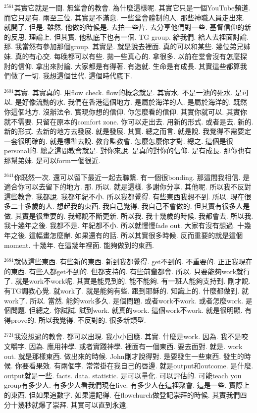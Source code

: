 \documentclass{book}
\begin{document}
$^{2561}$其實它就是一間.
無堂會的教會.
為什麼這樣呢.
其實它只是一個YouTube頻道.
而它只是有.
兩至三位.
其實是不滿意.
一些堂會體制的人.
那些神職人員走出來.
就開了.
但是.
雖然.
他做的時候是.
去拍一些片.
去分享他們對一些.
基督信仰的新的反思.
理論上.
但其實.
他私底下也有一個.
TG group.
給我們.
給人去裡面討論.
那.
我當然有參加那個group.
其實是.
就是說去裡面.
真的可以和某些.
幾位弟兄姊妹.
真的有心交.
每晚都可以有些.
拋一些真心的.
拿很多.
以前在堂會沒有怎麼探討的信仰.
拿出來討論.
大家都是有得著.
有造就.
生命是有成長.
其實這些都算我們做了一切.
我想這個世代.
這個時代底下.

$^{2601}$其實.
其實真的.
用flow check.
flow的概念就是.
其實水.
不是一池的死水.
是可以.
是好像流動的水.
我們在香港這個地方.
是屬於海洋的人.
是屬於海洋的.
既然你這個地方.
沒辦法令.
實現你想的信仰.
你怎麼看的信仰.
其實你就可以.
其實你就不需要.
只留在原本的comfort zone.
你可以走出去.
用新的形式.
或者是去.
新的.
新的形式.
去新的地方去發展.
就是發展.
其實.
總之而言.
就是說.
我覺得不需要定一套很明確的.
就是標準去說.
教育監教會.
怎麼怎麼你才對.
總之.
這個是很personal的.
總之這間教會就是.
對你來說.
是真的對你的信仰.
是有成長.
那你也有那幫弟妹.
是可以form一個很近.

$^{2641}$你既然一次.
還可以留下最近一起去聯繫.
有一個很bonding.
那這間我相信.
是適合你可以去留下的地方.
那.
所以.
就是這樣.
多謝你分享.
其他呢.
所以我不反對這些教會.
我都說.
我都年紀不小.
所以我都覺得.
有些東西我想不到.
所以.
現在很多二十多歲的人.
想起我的東西.
我自己覺得.
我自己不會做的.
但其實有很多人是做.
其實是很重要的.
我都說不斷更新.
所以我.
我十幾歲的時候.
我都會去.
所以我.
我十幾年之後.
我都不是.
年紀都不小.
所以就慢慢fade out.
大家有沒有想過.
十幾年之後.
這幅畫怎麼辦.
如果還有的話.
所以其實很多時候.
反而重要的就是這個moment.
十幾年.
在這幾年裡面.
能夠做到的東西.

$^{2681}$就做這些東西.
有些新的東西.
新到我都覺得.
get不到的.
不重要的.
正正我現在的東西.
有些人都get不到的.
但都支持的.
有些前輩都會.
所以.
只要能夠work就行了.
就是work不work呢.
其實是能見到的.
能不能夠.
有一班人能夠支持到.
剛才說.
有TG調教心覺.
就work了.
就是能夠有些.
跟到耶穌的.
知識上的.
什麼都做到.
就work了.
所以.
當然.
能夠work多久.
是個問題.
或者work不work.
或者怎麼work.
是個問題.
但總之.
你試試.
試到work.
就真的work.
這個work不work.
就是很明顯.
有得prove的.
所以我覺得.
不反對的.
很多新類型.

$^{2721}$我沒想過的教會.
都可以出現.
我小小回應.
其實.
什麼是work.
因為.
我不是咬文嚼字.
因為.
應用神學.
或者實踐神學.
裡面有一個東西.
要去面對.
就是.
work out.
就是那樣東西.
做出來的時候.
John剛才說得對.
是要發生一些東西.
發生的時候.
你要看果效.
有兩個字.
常常掛在我自己的唇邊.
就是output和outcome.
是什麼.
output就是一些.
facts.
data.
statistic.
是可以量化.
可以評估的.
可能teach you group有多少人.
有多少人看我們現在live.
有多少人在這裡聚會.
這是一些.
實際上的東西.
但如果追數字.
如果還記得.
在flowchurch做登記崇拜的時候.
其實我們四分十幾秒就爆了崇拜.
其實可以直到永遠.
\end{document}
